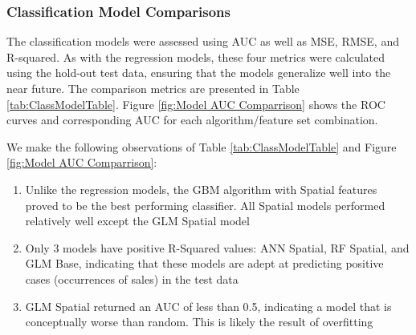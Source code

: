 \documentclass[12pt,]{article}
\providecommand{\tightlist}{%
  \setlength{\itemsep}{0pt}\setlength{\parskip}{0pt}}
\begin{document}
\hypertarget{classification-model-comparisons}{%
\subsubsection{Classification Model
Comparisons}\label{classification-model-comparisons}}

The classification models were assessed using AUC as well as MSE, RMSE,
and R-squared. As with the regression models, these four metrics were
calculated using the hold-out test data, ensuring that the models
generalize well into the near future. The comparison metrics are
presented in Table \ref{tab:ClassModelTable}. Figure
\ref{fig:Model AUC Comparrison} shows the ROC curves and corresponding
AUC for each algorithm/feature set combination.

\noindent We make the following observations of Table
\ref{tab:ClassModelTable} and Figure \ref{fig:Model AUC Comparrison}:

\begin{enumerate}
\def\labelenumi{\arabic{enumi})}
\tightlist
\item
  Unlike the regression models, the GBM algorithm with Spatial features
  proved to be the best performing classifier. All Spatial models
  performed relatively well except the GLM Spatial model
\item
  Only 3 models have positive R-Squared values: ANN Spatial, RF Spatial,
  and GLM Base, indicating that these models are adept at predicting
  positive cases (occurrences of sales) in the test data
\item
  GLM Spatial returned an AUC of less than 0.5, indicating a model that
  is conceptually worse than random. This is likely the result of
  overfitting
\end{enumerate}
\end{document}
